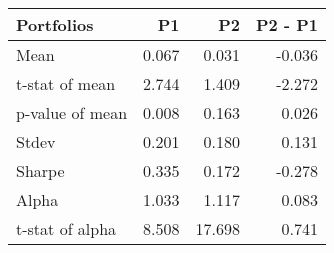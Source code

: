 \begin{tabular}{lrrr}
\toprule
Portfolios & P1 & P2 & P2 - P1 \\
\midrule
Mean & 0.067 & 0.031 & -0.036 \\
t-stat of mean & 2.744 & 1.409 & -2.272 \\
p-value of mean & 0.008 & 0.163 & 0.026 \\
Stdev & 0.201 & 0.180 & 0.131 \\
Sharpe & 0.335 & 0.172 & -0.278 \\
Alpha & 1.033 & 1.117 & 0.083 \\
t-stat of alpha & 8.508 & 17.698 & 0.741 \\
\bottomrule
\end{tabular}
